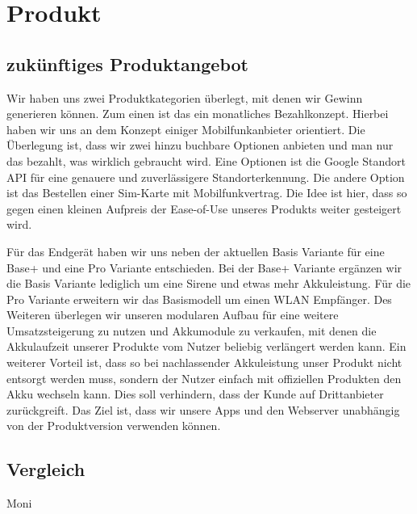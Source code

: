 \section{Produkt}
\subsection{zukünftiges Produktangebot}
Wir haben uns zwei Produktkategorien überlegt, mit denen wir Gewinn generieren können. Zum einen ist das ein monatliches Bezahlkonzept. Hierbei haben wir uns an dem Konzept einiger Mobilfunkanbieter orientiert. Die Überlegung ist, dass wir zwei hinzu buchbare Optionen anbieten und man nur das bezahlt, was wirklich gebraucht wird. Eine Optionen ist die Google Standort API für eine genauere und zuverlässigere Standorterkennung. Die andere Option ist das Bestellen einer Sim-Karte mit Mobilfunkvertrag. Die Idee ist hier, dass so gegen einen kleinen Aufpreis der Ease-of-Use unseres Produkts weiter gesteigert wird.

Für das Endgerät haben wir uns neben der aktuellen Basis Variante für eine Base+ und eine Pro Variante entschieden. Bei der Base+ Variante ergänzen wir die Basis Variante lediglich um eine Sirene und etwas mehr Akkuleistung. Für die Pro Variante erweitern wir das Basismodell um einen WLAN Empfänger. Des Weiteren überlegen wir unseren modularen Aufbau für eine weitere Umsatzsteigerung zu nutzen und Akkumodule zu verkaufen, mit denen die Akkulaufzeit unserer Produkte vom Nutzer beliebig verlängert werden kann. Ein weiterer Vorteil ist, dass so bei nachlassender Akkuleistung unser Produkt nicht entsorgt werden muss, sondern der Nutzer einfach mit offiziellen Produkten den Akku wechseln kann. Dies soll verhindern, dass der Kunde auf Drittanbieter zurückgreift.
Das Ziel ist, dass wir unsere Apps und den Webserver unabhängig von der Produktversion verwenden können.

\subsection{Vergleich} Moni